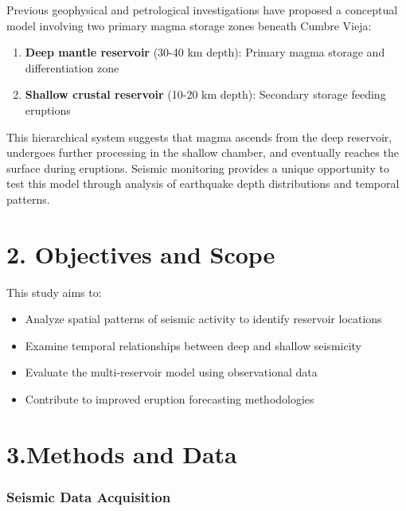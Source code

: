 \documentclass[
  letterpaper,
]{book}
\providecommand{\tightlist}{%
  \setlength{\itemsep}{0pt}\setlength{\parskip}{0pt}}
\begin{document}
Previous geophysical and petrological investigations have proposed a
conceptual model involving two primary magma storage zones beneath
Cumbre Vieja:

\begin{enumerate}
\def\labelenumi{\arabic{enumi}.}
\tightlist
\item
  \textbf{Deep mantle reservoir} (30-40 km depth): Primary magma storage
  and differentiation zone
\item
  \textbf{Shallow crustal reservoir} (10-20 km depth): Secondary storage
  feeding eruptions
\end{enumerate}

This hierarchical system suggests that magma ascends from the deep
reservoir, undergoes further processing in the shallow chamber, and
eventually reaches the surface during eruptions. Seismic monitoring
provides a unique opportunity to test this model through analysis of
earthquake depth distributions and temporal patterns.


\chapter{2. Objectives and Scope}\label{objectives-and-scope}

This study aims to:

\begin{itemize}
\tightlist
\item
  Analyze spatial patterns of seismic activity to identify reservoir
  locations
\item
  Examine temporal relationships between deep and shallow seismicity
\item
  Evaluate the multi-reservoir model using observational data
\item
  Contribute to improved eruption forecasting methodologies
\end{itemize}


\chapter{3.Methods and Data}\label{methods-and-data}

\subsection{Seismic Data Acquisition}\label{seismic-data-acquisition}
\end{document}
